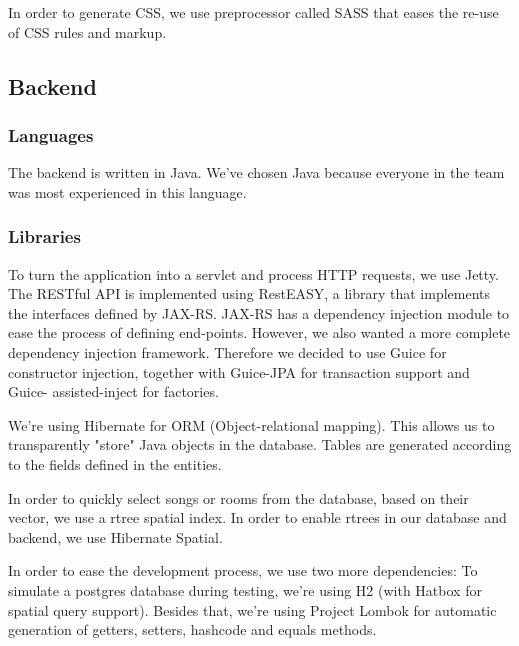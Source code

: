 In order to generate CSS, we use preprocessor called SASS that eases the re-use of CSS rules and markup.

\subsection{Backend}

\subsubsection{Languages}
The backend is written in Java.
We've chosen Java because everyone in the team was most experienced in this language.

\subsubsection{Libraries}
To turn the application into a servlet and process HTTP requests, we use Jetty.
The RESTful API is implemented using RestEASY, a library that implements the interfaces defined by JAX-RS.
JAX-RS has a dependency injection module to ease the process of defining end-points.
However, we also wanted a more complete dependency injection framework.
Therefore we decided to use Guice for constructor injection, together with Guice-JPA for transaction support and Guice- assisted-inject for factories.

We're using Hibernate for ORM (Object-relational mapping).
This allows us to transparently "store" Java objects in the database.
Tables are generated according to the fields defined in the entities.

In order to quickly select songs or rooms from the database, based on their vector, we use a \gls{rtree} spatial index.
In order to enable  \glspl{rtree} in our database and backend, we use Hibernate Spatial.

In order to ease the development process, we use two more dependencies:
To simulate a postgres database during testing, we're using H2 (with Hatbox for spatial query support).
Besides that, we're using Project Lombok for automatic generation of getters, setters, hashcode and equals methods.
